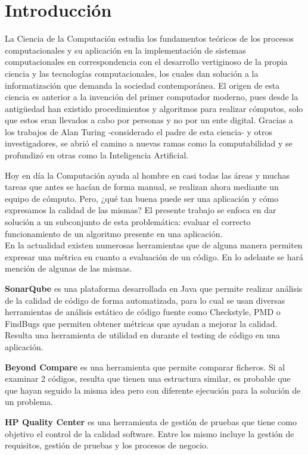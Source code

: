 \documentclass[a4paper,12pt]{book}
\begin{document}
\chapter{Introducción}

	La Ciencia de la Computación estudia los fundamentos teóricos de los procesos computacionales y su aplicación en la implementación de sistemas computacionales en correspondencia con el desarrollo vertiginoso de la propia ciencia y las tecnologías computacionales, los cuales dan solución a la informatización que demanda la sociedad contemporánea. El origen de esta ciencia es anterior a la invención del primer computador moderno, pues desde la antigüedad han existido procedimientos y algoritmos para realizar cómputos, solo que estos eran llevados a cabo por personas y no por un ente digital. Gracias a los trabajos de Alan Turing \cite{Turing} -considerado el padre de esta ciencia- y otros investigadores, se abrió el camino a nuevas ramas como la computabilidad y se profundizó en otras como la Inteligencia Artificial.
	
	Hoy en día la Computación ayuda al hombre en casi todas las áreas y muchas tareas que antes se hacían de forma manual, se realizan ahora mediante un equipo de cómputo. Pero, ¿qué tan buena puede ser una aplicación y cómo expresamos la calidad de las mismas? El presente trabajo se enfoca en dar solución a un subconjunto de esta problemática: evaluar el correcto funcionamiento de un algoritmo presente en una aplicación. \\
	
	
	En la actualidad existen numerosas herramientas que de alguna manera permiten expresar una métrica en cuanto a evaluación de un código. En lo adelante se hará mención de algunas de las mismas.
	
	\textbf{SonarQube} es una plataforma desarrollada en Java que permite realizar análisis de la calidad de código de forma automatizada, para lo cual se usan diversas herramientas de análisis estático de código fuente como Checkstyle, PMD o FindBugs que permiten obtener métricas que ayudan a mejorar la calidad. Resulta una herramienta de utilidad en durante el testing de código en una aplicación.
	
	\textbf{Beyond Compare} es una herramienta que permite comparar ficheros. Si al examinar 2 códigos, resulta que tienen una estructura similar, es probable que que hayan seguido la misma idea pero con diferente ejecución para la solución de un problema.
	
	\textbf{HP Quality Center} es una herramienta de gestión de pruebas que tiene como objetivo el control de la calidad software. Entre los mismo incluye la gestión de requisitos, gestión de pruebas y los procesos de negocio. \\
	
\end{document}
